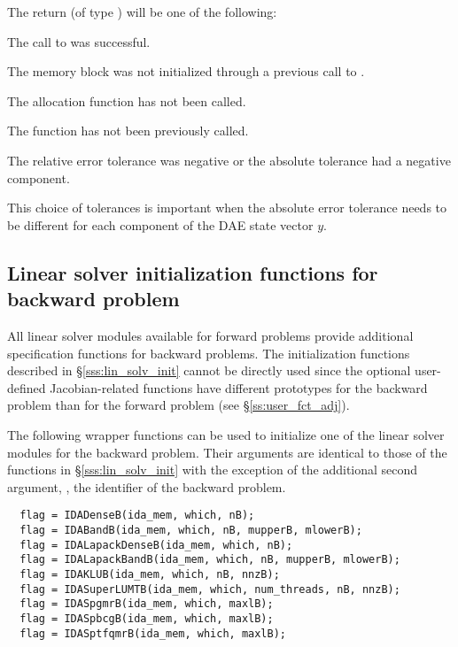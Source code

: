 {
  The return  (of type ) will be one of the following:
  \begin{args}
  \item[\Id{IDA\_SUCCESS}]
    The call to  was successful.
  \item[\Id{IDA\_MEM\_NULL}] 
    The {\idas} memory block was not initialized through a previous call to
    .
  \item[\Id{IDA\_NO\_MALLOC}] 
    The allocation function  has not been called.
  \item[\Id{IDA\_NO\_ADJ}]
    The function  has not been previously called.
  \item[\Id{IDA\_ILL\_INPUT}] 
    The relative error tolerance was negative or the absolute tolerance
    had a negative component.
  \end{args}
}
{
  This choice of tolerances is important when the absolute error tolerance needs to
  be different for each component of the DAE state vector $y$.
}

\subsection{Linear solver initialization functions for backward problem}
\label{sss:lin_solv_b}

All {\idas} linear solver modules available for forward problems
provide additional specification functions for backward problems.  The
initialization functions described in \S\ref{sss:lin_solv_init} cannot
be directly used since the optional user-defined Jacobian-related
functions have different prototypes for the backward problem than for
the forward problem (see \S\ref{ss:user_fct_adj}).

The following wrapper functions can be used to initialize one of the linear
solver modules for the backward problem. Their arguments are identical to those
of the functions in \S\ref{sss:lin_solv_init} with the exception of the additional
second argument, , the identifier of the backward problem.
\begin{verbatim}
  flag = IDADenseB(ida_mem, which, nB);
  flag = IDABandB(ida_mem, which, nB, mupperB, mlowerB);
  flag = IDALapackDenseB(ida_mem, which, nB);
  flag = IDALapackBandB(ida_mem, which, nB, mupperB, mlowerB);
  flag = IDAKLUB(ida_mem, which, nB, nnzB);
  flag = IDASuperLUMTB(ida_mem, which, num_threads, nB, nnzB);
  flag = IDASpgmrB(ida_mem, which, maxlB);
  flag = IDASpbcgB(ida_mem, which, maxlB);
  flag = IDASptfqmrB(ida_mem, which, maxlB);
\end{verbatim}

